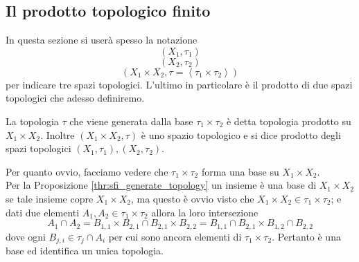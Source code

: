 \subsection{\textcolor{TopGener}{\textbf{Il prodotto topologico finito}}}



In questa sezione si userà spesso la notazione 
\begin{equation*}
(X_1, \tau_1)
\end{equation*}
\begin{equation*}
(X_2, \tau_2)
\end{equation*}
\begin{equation*}
(X_1 \times X_2, \tau = \left\langle\tau_1 \times \tau_2 \right\rangle)
\end{equation*}
per indicare tre spazi topologici. L'ultimo in particolare è il prodotto di due spazi topologici che adesso definiremo.

\begin{definition}
	La topologia $\tau$ che viene generata dalla base $\tau_1 \times \tau_2$ è detta topologia prodotto su $X_1 \times X_2$. Inoltre $(X_1 \times X_2, \tau)$ è uno spazio topologico e si dice prodotto degli spazi topologici $(X_1, \tau_1), (X_2, \tau_2)$.
\end{definition}

\begin{remark}
	Per quanto ovvio, facciamo vedere che $\tau_1 \times \tau_2$ forma una base su $X_1 \times X_2$. \\ Per la Proposizione \ref{thr:sfi_generate_topology} un insieme è una base di $X_1 \times X_2$ se tale insieme copre $X_1 \times X_2$, ma questo è ovvio visto che $X_1 \times X_2 \in \tau_1 \times \tau_2$; e dati due elementi $A_1, A_2 \in \tau_1 \times \tau_2$ allora la loro intersezione 
	\begin{equation*}
	A_1 \cap A_2 = B_{1,1} \times B_{2,1} \cap B_{2,1} \times B_{2,2} = B_{1,1}\cap B_{2,1} \times B_{1,2} \cap B_{2,2}
	\end{equation*}
	dove ogni $B_{j,i} \in \tau_j \cap A_i$ per cui sono ancora elementi di $\tau_1 \times \tau_2$. Pertanto è una base ed identifica un unica topologia.
\end{remark}

